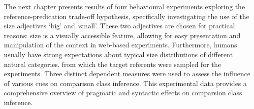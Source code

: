 The next chapter presents results of four behavioural experiments exploring the reference-predication trade-off hypothesis, specifically investigating the use of the size adjectives ‘big’ and ‘small’. These two adjectives are chosen for practical reasons: size is a visually accessible feature, allowing for easy presentation and manipulation of the context in web-based experiments. Furthermore, humans usually have strong expectations about typical size distributions of different natural categories, from which the target referents were sampled for the experiments. Three distinct dependent measures were used to assess the influence of various cues on comparison class inference. This experimental data provides a comprehensive overview of pragmatic and syntactic effects on comparsion class inference. 